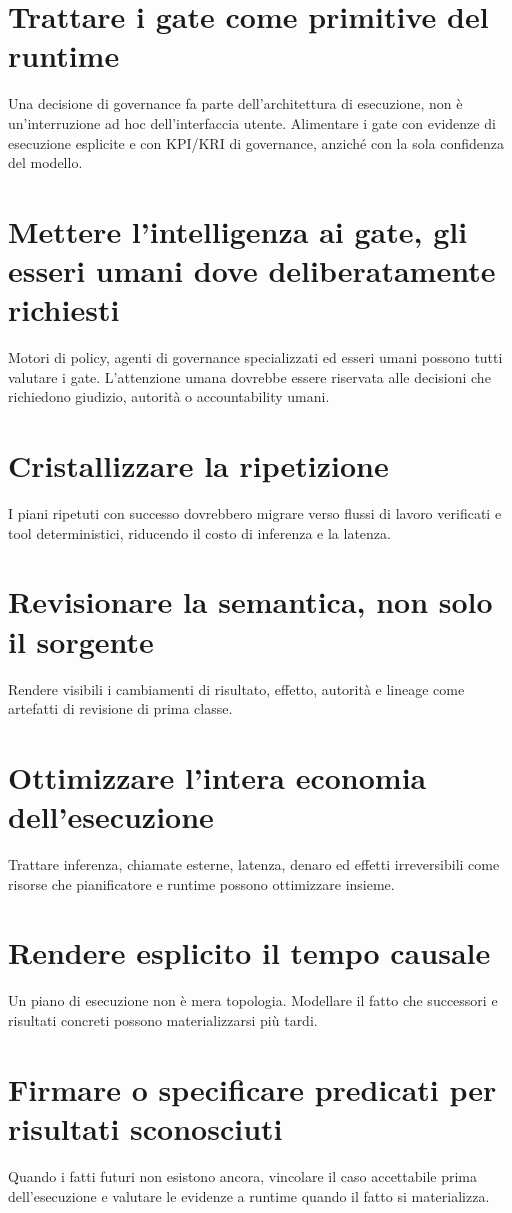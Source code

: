 \documentclass[10pt,oneside,openany]{book}
\begin{document}
\section{Trattare i gate come primitive del runtime}
Una decisione di governance fa parte dell'architettura di esecuzione, non è un'interruzione ad hoc dell'interfaccia utente. Alimentare i gate con evidenze di esecuzione esplicite e con KPI/KRI di governance, anziché con la sola confidenza del modello.

\section{Mettere l'intelligenza ai gate, gli esseri umani dove deliberatamente richiesti}
Motori di policy, agenti di governance specializzati ed esseri umani possono tutti valutare i gate. L'attenzione umana dovrebbe essere riservata alle decisioni che richiedono giudizio, autorità o accountability umani.

\section{Cristallizzare la ripetizione}
I piani ripetuti con successo dovrebbero migrare verso flussi di lavoro verificati e tool deterministici, riducendo il costo di inferenza e la latenza.

\section{Revisionare la semantica, non solo il sorgente}
Rendere visibili i cambiamenti di risultato, effetto, autorità e lineage come artefatti di revisione di prima classe.

\section{Ottimizzare l'intera economia dell'esecuzione}
Trattare inferenza, chiamate esterne, latenza, denaro ed effetti irreversibili come risorse che pianificatore e runtime possono ottimizzare insieme.


\section{Rendere esplicito il tempo causale}
Un piano di esecuzione non è mera topologia. Modellare il fatto che successori e risultati concreti possono materializzarsi più tardi.

\section{Firmare o specificare predicati per risultati sconosciuti}
Quando i fatti futuri non esistono ancora, vincolare il caso accettabile prima dell'esecuzione e valutare le evidenze a runtime quando il fatto si materializza.
\end{document}
